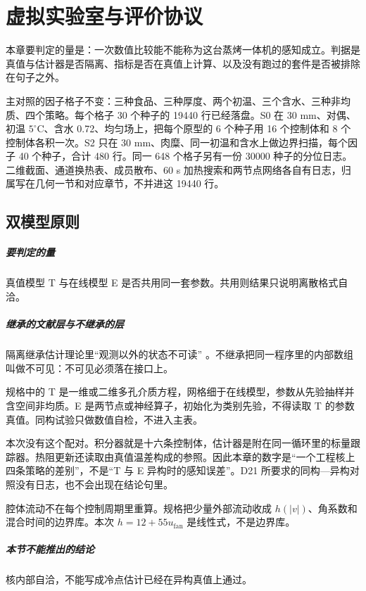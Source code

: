\chapter{虚拟实验室与评价协议}
\label{ch:sim}

本章要判定的量是：一次数值比较能不能称为这台蒸烤一体机的感知成立。判据是真值与估计器是否隔离、指标是否在真值上计算、以及没有跑过的套件是否被排除在句子之外。

主对照的因子格子不变：三种食品、三种厚度、两个初温、三个含水、三种非均质、四个策略。每个格子 30 个种子的 19440 行已经落盘。S0 在 30 mm、对偶、初温 \(5^\circ\mathrm{C}\)、含水 0.72、均匀场上，把每个原型的 6 个种子用 16 个控制体和 8 个控制体各积一次。S2 只在 30 mm、肉糜、同一初温和含水上做边界扫描，每个因子 40 个种子，合计 480 行。同一 648 个格子另有一份 30000 种子的分位日志。二维截面、通道换热表、成员散布、60 s 加热搜索和两节点网络各自有日志，归属写在几何一节和对应章节，不并进这 19440 行。

\section{双模型原则}

\paragraph{要判定的量}
真值模型 T 与在线模型 E 是否共用同一套参数。共用则结果只说明离散格式自洽。

\paragraph{继承的文献层与不继承的层}
隔离继承估计理论里“观测以外的状态不可读” \cite{ozisik2000,evensen2003}。不继承把同一程序里的内部数组叫做不可见：不可见必须落在接口上。

规格中的 T 是一维或二维多孔介质方程，网格细于在线模型，参数从先验抽样并含空间非均质。E 是两节点或神经算子，初始化为类别先验，不得读取 T 的参数真值。同构试验只做数值自检，不进入主表。

本次没有这个配对。积分器就是十六条控制体，估计器是附在同一循环里的标量跟踪器。热阻更新还读取由真值温差构成的参照。因此本章的数字是“一个工程核上四条策略的差别”，不是“T 与 E 异构时的感知误差”。D21 所要求的同构—异构对照没有日志，也不会出现在结论句里。

腔体流动不在每个控制周期里重算。规格把少量外部流动收成 \(h(|v|)\)、角系数和混合时间的边界库。本次 \(h=12+55u_{\mathrm{fan}}\) 是线性式，不是边界库。

\paragraph{本节不能推出的结论}
核内部自洽，不能写成冷点估计已经在异构真值上通过。


